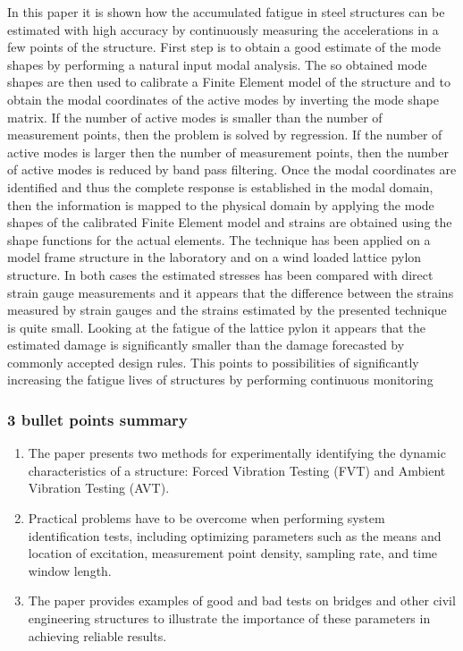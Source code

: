 \documentclass[
  letterpaper,
  DIV=11,
  numbers=noendperiod]{scrreprt}
\providecommand{\tightlist}{%
  \setlength{\itemsep}{0pt}\setlength{\parskip}{0pt}}\usepackage{longtable,booktabs,array}
\begin{document}
In this paper it is shown how the accumulated fatigue in steel
structures can be estimated with high accuracy by continuously measuring
the accelerations in a few points of the structure. First step is to
obtain a good estimate of the mode shapes by performing a natural input
modal analysis. The so obtained mode shapes are then used to calibrate a
Finite Element model of the structure and to obtain the modal
coordinates of the active modes by inverting the mode shape matrix. If
the number of active modes is smaller than the number of measurement
points, then the problem is solved by regression. If the number of
active modes is larger then the number of measurement points, then the
number of active modes is reduced by band pass filtering. Once the modal
coordinates are identified and thus the complete response is established
in the modal domain, then the information is mapped to the physical
domain by applying the mode shapes of the calibrated Finite Element
model and strains are obtained using the shape functions for the actual
elements. The technique has been applied on a model frame structure in
the laboratory and on a wind loaded lattice pylon structure. In both
cases the estimated stresses has been compared with direct strain gauge
measurements and it appears that the difference between the strains
measured by strain gauges and the strains estimated by the presented
technique is quite small. Looking at the fatigue of the lattice pylon it
appears that the estimated damage is significantly smaller than the
damage forecasted by commonly accepted design rules. This points to
possibilities of significantly increasing the fatigue lives of
structures by performing continuous monitoring

\hypertarget{bullet-points-summary-16}{%
\subsubsection{3 bullet points summary}\label{bullet-points-summary-16}}

\begin{enumerate}
\def\labelenumi{\arabic{enumi}.}
\tightlist
\item
  The paper presents two methods for experimentally identifying the
  dynamic characteristics of a structure: Forced Vibration Testing (FVT)
  and Ambient Vibration Testing (AVT).
\item
  Practical problems have to be overcome when performing system
  identification tests, including optimizing parameters such as the
  means and location of excitation, measurement point density, sampling
  rate, and time window length.
\item
  The paper provides examples of good and bad tests on bridges and other
  civil engineering structures to illustrate the importance of these
  parameters in achieving reliable results.
\end{enumerate}
\end{document}

